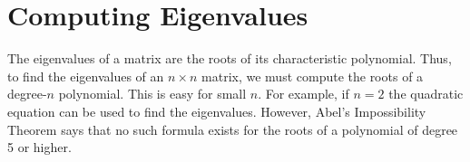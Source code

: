 \section*{Computing Eigenvalues}
The eigenvalues of a matrix are the roots of its characteristic polynomial. 
Thus, to find the eigenvalues of an $n \times n$ matrix, we must compute the roots of a degree-$n$ polynomial. 
This is easy for small $n$. 
For example, if $n=2$ the quadratic equation can be used to find the eigenvalues. 
However, Abel's Impossibility Theorem says that no such formula exists for the roots of a polynomial of degree 5 or higher.

